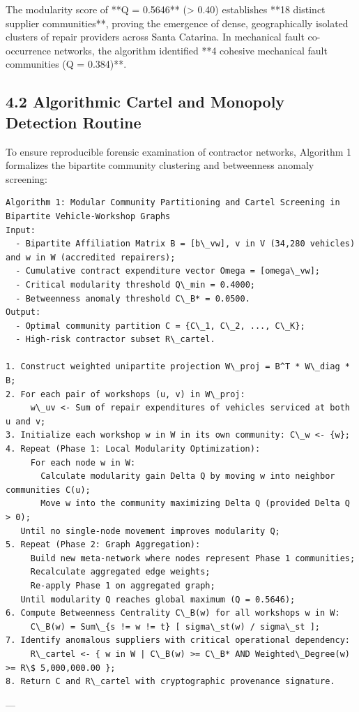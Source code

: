 \documentclass[10pt,a4paper,journal]{article}
\begin{document}
The modularity score of **Q = 0.5646** (> 0.40) establishes **18 distinct supplier communities**, proving the emergence of dense, geographically isolated clusters of repair providers across Santa Catarina. In mechanical fault co-occurrence networks, the algorithm identified **4 cohesive mechanical fault communities (Q = 0.384)**.

\subsection{4.2 Algorithmic Cartel and Monopoly Detection Routine}
To ensure reproducible forensic examination of contractor networks, Algorithm 1 formalizes the bipartite community clustering and betweenness anomaly screening:

\begin{verbatim}
Algorithm 1: Modular Community Partitioning and Cartel Screening in Bipartite Vehicle-Workshop Graphs
Input:
  - Bipartite Affiliation Matrix B = [b\_vw], v in V (34,280 vehicles) and w in W (accredited repairers);
  - Cumulative contract expenditure vector Omega = [omega\_vw];
  - Critical modularity threshold Q\_min = 0.4000;
  - Betweenness anomaly threshold C\_B* = 0.0500.
Output:
  - Optimal community partition C = {C\_1, C\_2, ..., C\_K};
  - High-risk contractor subset R\_cartel.

1. Construct weighted unipartite projection W\_proj = B^T * W\_diag * B;
2. For each pair of workshops (u, v) in W\_proj:
     w\_uv <- Sum of repair expenditures of vehicles serviced at both u and v;
3. Initialize each workshop w in W in its own community: C\_w <- {w};
4. Repeat (Phase 1: Local Modularity Optimization):
     For each node w in W:
       Calculate modularity gain Delta Q by moving w into neighbor communities C(u);
       Move w into the community maximizing Delta Q (provided Delta Q > 0);
   Until no single-node movement improves modularity Q;
5. Repeat (Phase 2: Graph Aggregation):
     Build new meta-network where nodes represent Phase 1 communities;
     Recalculate aggregated edge weights;
     Re-apply Phase 1 on aggregated graph;
   Until modularity Q reaches global maximum (Q = 0.5646);
6. Compute Betweenness Centrality C\_B(w) for all workshops w in W:
     C\_B(w) = Sum\_{s != w != t} [ sigma\_st(w) / sigma\_st ];
7. Identify anomalous suppliers with critical operational dependency:
     R\_cartel <- { w in W | C\_B(w) >= C\_B* AND Weighted\_Degree(w) >= R\$ 5,000,000.00 };
8. Return C and R\_cartel with cryptographic provenance signature.
\end{verbatim}
---
\end{document}
